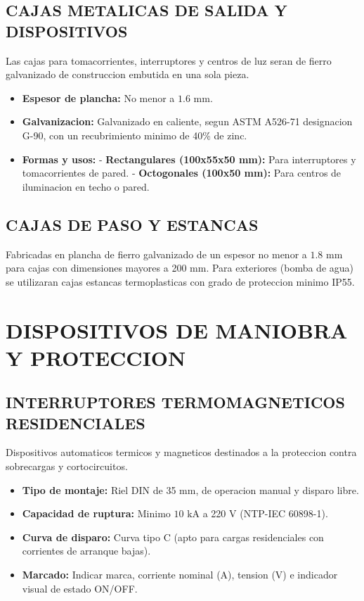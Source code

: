 \subsection{CAJAS METALICAS DE SALIDA Y DISPOSITIVOS}
Las cajas para tomacorrientes, interruptores y centros de luz seran de fierro galvanizado de construccion embutida en una sola pieza.
\begin{itemize}
  \item \textbf{Espesor de plancha:} No menor a \(1.6\text{ mm}\).
  \item \textbf{Galvanizacion:} Galvanizado en caliente, segun ASTM A526-71 designacion G-90, con un recubrimiento minimo de 40\% de zinc.
  \item \textbf{Formas y usos:}
    - \textbf{Rectangulares (100x55x50 mm):} Para interruptores y tomacorrientes de pared.
    - \textbf{Octogonales (100x50 mm):} Para centros de iluminacion en techo o pared.
\end{itemize}

\subsection{CAJAS DE PASO Y ESTANCAS}
Fabricadas en plancha de fierro galvanizado de un espesor no menor a \(1.8\text{ mm}\) para cajas con dimensiones mayores a 200 mm. Para exteriores (bomba de agua) se utilizaran cajas estancas termoplasticas con grado de proteccion minimo IP55.

\section{DISPOSITIVOS DE MANIOBRA Y PROTECCION}

\subsection{INTERRUPTORES TERMOMAGNETICOS RESIDENCIALES}
Dispositivos automaticos termicos y magneticos destinados a la proteccion contra sobrecargas y cortocircuitos.
\begin{itemize}
  \item \textbf{Tipo de montaje:} Riel DIN de 35 mm, de operacion manual y disparo libre.
  \item \textbf{Capacidad de ruptura:} Minimo \(10\text{ kA}\) a 220 V (NTP-IEC 60898-1).
  \item \textbf{Curva de disparo:} Curva tipo C (apto para cargas residenciales con corrientes de arranque bajas).
  \item \textbf{Marcado:} Indicar marca, corriente nominal (A), tension (V) e indicador visual de estado ON/OFF.
\end{itemize}

